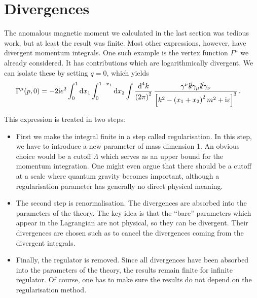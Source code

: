 \documentclass[12pt]{report}
\renewcommand{\slash}[2][4]{\ensuremath{\rlap{\raisebox{1pt}{$\mspace{#1mu}/$}}#2}}
\renewcommand{\d}{\text{d}}
\renewcommand{\i}{\ensuremath{\text{i}}}
\newcommand{\2}{\ensuremath{\sqrt{2}\,}}
\renewcommand{\d}{\ensuremath{\text{d}}}
\begin{document}
{      

    \section{Divergences}
      The anomalous magnetic moment we calculated in the last section was tedious work, but at least
      the result was finite. Most other expressions, however, have divergent  momentum
      integrals. One such example is the vertex function $\Gamma^\mu$ we already considered. It has
      contributions which are logarithmically divergent. We can isolate these by setting $q=0$,
      which yields
      \begin{align}\label{eq:vertex_q=0}
        \Gamma^\mu (p,0)&= -2\i e^2 \int_0^1 \d x_1 \int_0^{1-x_1} \d x_2 \int\frac{\d^4
          k}{\left(2\pi\right)^2} \, \frac{\gamma^\nu\slash[2]{k} \gamma_\mu \slash[2]{k}
          \gamma_\nu}{\left[k^2 -\left(x_1+x_2\right)^2 m^2 +\i \varepsilon \right]^3}\,.
      \end{align}
      
      This expression is treated in two steps:
      \begin{itemize}
        \item First we make the integral finite in a step called
          regularisation. In this step, we 
          have to introduce a new parameter of mass dimension 1. An obvious choice would be a
          cutoff $\Lambda$ which serves as an upper bound for the momentum integration. One might
          even argue that there should be a cutoff at a scale where quantum gravity 
          becomes important, although a
          regularisation parameter has generally no direct physical meaning.
        \item The second step is renormalisation. The divergences are
          absorbed into the parameters 
          of the theory. The key idea is that the ``bare'' parameters which appear in the Lagrangian
          are not physical, so they can be divergent. Their divergences are chosen such as to cancel
          the divergences coming from the divergent integrals.
        \item Finally, the regulator is removed. Since all divergences have been absorbed into 
          the parameters of the theory,
          the results remain finite for infinite regulator. Of course, one has to make sure the 
          results do not depend on the regularisation method.
      \end{itemize}
      
}
\end{document}
